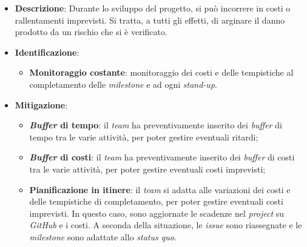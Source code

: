 \label{risk:costi e tempi imprevisti}
\begin{itemize}
	\item \textbf{Descrizione}:
	      Durante lo sviluppo del progetto, si può incorrere in costi o
	      rallentamenti imprevisti. Si tratta, a tutti gli effetti, di arginare
	      il danno prodotto da un rischio che si è verificato.
	\item \textbf{Identificazione}:
	      \begin{itemize}
		      \item \textbf{Monitoraggio costante}: monitoraggio dei costi e delle
		            tempistiche al completamento delle \textit{milestone} e
		            ad ogni \textit{stand-up}.
	      \end{itemize}
	\item \textbf{Mitigazione}:
	      \begin{itemize}
		      \item \textbf{\textit{Buffer} di tempo}: il \textit{team} ha
		            preventivamente inserito dei \textit{buffer} di tempo
		            tra le varie attività, per poter gestire eventuali
		            ritardi;

		      \item \textbf{\textit{Buffer} di costi}: il \textit{team} ha
		            preventivamente inserito dei \textit{buffer} di costi
		            tra le varie attività, per poter gestire eventuali
		            costi imprevisti;

		      \item \textbf{Pianificazione in itinere}: il \textit{team} si adatta
		            alle variazioni dei costi e delle tempistiche di
		            completamento, per poter gestire eventuali costi
		            imprevisti. In questo caso, sono aggiornate le scadenze
		            nel \textit{project} su \textit{GitHub} e i costi.
		            A seconda della situazione, le \textit{issue} sono
		            riassegnate e le \textit{milestone} sono adattate allo
		            \textit{status quo}.
	      \end{itemize}
\end{itemize}
